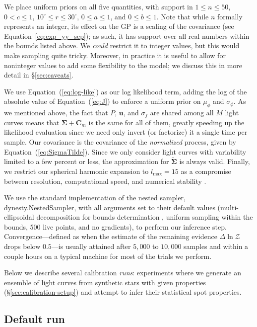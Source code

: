 \documentclass[modern,linenumbers]{aastex62}
\begin{document}
We place uniform priors on all five quantities, with support in
$1 \leq n \leq 50$, $0 < c \leq 1$,
$10^\circ \leq r \leq 30^\circ$,
$0 \leq a \leq 1$, and
$0 \leq b \leq 1$. Note that while $n$ formally represents an integer,
its effect on the GP is a scaling of the covariance (see Equation~\ref{eq:exp_yy_sep});
as such, it has support over all real numbers within the bounds listed
above. We \emph{could} restrict it to integer values, but this would make
sampling quite tricky. Moreover, in practice it is useful to allow for
noninteger values to add some flexibility to the model; we discuss this
in more detail in \S\ref{sec:caveats}.

We use Equation~(\ref{eq:log-like}) as our log likelihood
term, adding the log of the absolute value of Equation~(\ref{eq:J}) to
enforce a uniform prior on $\mu_\phi$ and $\sigma_\phi$. As we mentioned
above, the fact that $P$, $\mathbf{u}$, and $\sigma_f$ are shared among
all $M$ light curves means that $\pmb{\Sigma} + \mathbf{C}_m$ is the same for all
of them, greatly speeding up the likelihood evaluation since we need
only invert (or factorize) it a single time per sample. Our
covariance is the covariance of the \emph{normalized} process,
given by Equation~(\ref{eq:SigmaTilde}). Since we only consider light curves
with variability limited to a few percent or less, the approximation for
$\tilde{\pmb{\Sigma}}$ is always valid. Finally, we restrict our spherical
harmonic expansion to $l_\mathrm{max} = 15$ as a compromise between
resolution, computational speed, and numerical stability \citep[see][]{JOSSPaper}.

We use the standard implementation of the nested sampler,
\textsf{dynesty.NestedSampler}, with all arguments set to their
default values
(multi-ellipsoidal decomposition for bounds determination \citep{Feroz2009},
uniform sampling within the bounds,
500 live points,
and no gradients), to perform our inference step.
Convergence---defined as when the estimate of the remaining evidence $\Delta\ln \mathcal{Z}$ drops
below $0.5$---is usually attained after $5{,}000$ to $10{,}000$ samples and
within a couple hours on a typical machine for most of the trials we perform.

Below we describe several calibration \emph{runs}: experiments where we generate
an ensemble of light curves from synthetic stars with given properties
(\S\ref{sec:calibration-setup}) and attempt to infer their statistical spot
properties.

\subsection{Default run}
\label{sec:inference-default}
\end{document}
